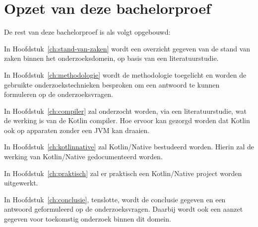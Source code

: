 \section{Opzet van deze bachelorproef}
\label{sec:opzet-bachelorproef}

De rest van deze bachelorproef is als volgt opgebouwd:

In Hoofdstuk~\ref{ch:stand-van-zaken} wordt een overzicht gegeven van de stand van zaken binnen het onderzoeksdomein, op basis van een literatuurstudie.

In Hoofdstuk~\ref{ch:methodologie} wordt de methodologie toegelicht en worden de gebruikte onderzoekstechnieken besproken om een antwoord te kunnen formuleren op de onderzoeksvragen.

In Hoofdstuk~\ref{ch:compiler} zal onderzocht worden, via een literatuurstudie, wat de werking is van de Kotlin compiler. Hoe ervoor kan gezorgd worden dat Kotlin ook op apparaten zonder een JVM kan draaien.

In Hoofdstuk~\ref{ch:kotlinnative} zal Kotlin/Native bestudeerd worden. Hierin zal de werking van Kotlin/Native gedocumenteerd worden.

In Hoofdstuk~\ref{ch:praktisch} zal er praktisch een Kotlin/Native project worden uitgewerkt.

In Hoofdstuk~\ref{ch:conclusie}, tenslotte, wordt de conclusie gegeven en een antwoord geformuleerd op de onderzoeksvragen. Daarbij wordt ook een aanzet gegeven voor toekomstig onderzoek binnen dit domein.

